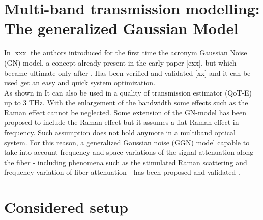 \documentclass[journal]{IEEEtran}
\begin{document}
\section{Multi-band transmission modelling: The generalized Gaussian Model}\label{Sec:GGN}
%
In [xxx] the authors introduced for the first time the acronym Gaussian Noise (GN) model, a concept already present in the early paper [exx], but which became ultimate only after \cite{poggiolini2014gn}. Has been verified and validated [xx] and it can be used get an easy and quick system optimization\cite{curri2015design}.\\
As shown in \cite{Filer:18} It can also be used in a quality of transmission estimator (QoT-E) up to 3 THz.
With the enlargement of the bandwidth some effects such as the Raman effect cannot be neglected. Some extension of the GN-model has been proposed to include the Raman effect \cite{curri2013extension} but it assumes a flat Raman effect in frequency. Such assumption does not hold anymore in a multiband optical system.
For this reason, a generalized Gaussian noise (GGN) model capable to take into account frequency and space variations of the signal attenuation along the fiber - including phenomena such as the stimulated Raman scattering and frequency variation of fiber attenuation - has been proposed \cite{cantono_introducing_2017,roberts_channel_2017,semrau_gaussian_2017} and validated \cite{cantono_modelling_2018, cantono_interplay_2018}.

%
\section{Considered setup}\label{Sec:Setup}
\end{document}
